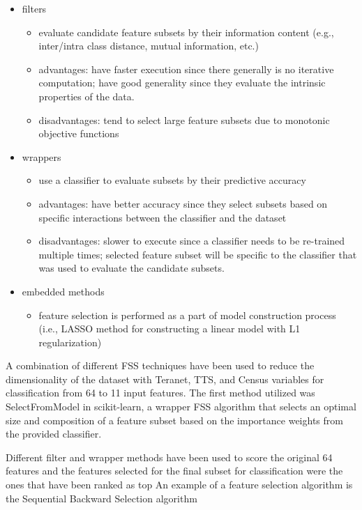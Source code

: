 \begin{itemize}
    \item filters
    \begin{itemize}
        \item evaluate candidate feature subsets by their information content (e.g., inter/intra class distance, mutual information, etc.)
        \item advantages: have faster execution since there generally is no iterative computation;
        have good generality since they evaluate the intrinsic properties of the data.
        \item disadvantages: tend to select large feature subsets due to monotonic objective functions
    \end{itemize}
    \item wrappers
    \begin{itemize}
        \item use a classifier to evaluate subsets by their predictive accuracy
        \item advantages: have better accuracy since they select subsets based on specific interactions between the classifier and the dataset
        \item disadvantages: slower to execute since a classifier needs to be re-trained multiple times;
        selected feature subset will be specific to the classifier that was used to evaluate the candidate subsets.
    \end{itemize}
    \item embedded methods
    \begin{itemize}
        \item feature selection is performed as a part of model construction process (i.e., LASSO method for constructing a linear model with L1 regularization)\cite{Scikit-learndevelopers2019}
    \end{itemize}
\end{itemize}

A combination of different FSS techniques have been used to reduce the dimensionality of the dataset with Teranet, TTS, and Census variables for classification from 64 to 11 input features.
The first method utilized was SelectFromModel in scikit-learn, a wrapper FSS algorithm that selects an optimal size and composition of a feature subset based on the importance weights from the provided classifier.

Different filter and wrapper methods have been used to score the original 64 features and the features selected for the final subset for classification were the ones that have been ranked as top
An example of a feature selection algorithm is the Sequential Backward Selection algorithm

